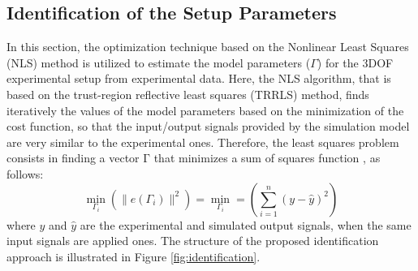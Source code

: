 \documentclass[3p,times]{elsarticle}
\begin{document}
\subsection{Identification of the Setup Parameters}
\noindent In this section, the optimization technique based on the Nonlinear Least Squares (NLS) method is utilized to estimate the model parameters ($\Gamma$) for the 3DOF experimental setup from
experimental data. Here, the NLS algorithm, that is based on the trust-region reflective least squares (TRRLS) method, finds iteratively the values of the model parameters based on the minimization of the cost function, so that the input/output signals provided by the simulation model are very similar to the experimental ones. Therefore, the least squares problem consists
in finding a vector $\boldsymbol{\mathrm{\Gamma}}$ that minimizes a sum of squares function \cite{article_Eriksson}, as follows:
\begin{equation}
	\min_{\Gamma_i}\left(\parallel e(\Gamma_i) \parallel^2\right) = 
	\min_{\Gamma_i} = \left(\sum_{i=1}^{n}(y-\hat y)^2\right)
\end{equation}
where $y$ and $\hat y$ are the experimental and simulated output signals, when the same input signals are applied ones.
The structure of the proposed identification approach is illustrated in Figure \ref{fig:identification}.
\end{document}
